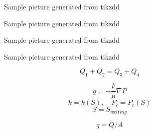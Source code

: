 \documentclass[
	12pt
] {article}
\begin{document}
	\newpage \begin{figure}[H]
		\centering
		\begin{subfigure}[b]{\textwidth}
			\centering
			
		\end{subfigure}
		\caption{Sample picture generated from tikzdd}
	\end{figure}


	\newpage \begin{figure}[H]
		\centering
		\begin{subfigure}[b]{\textwidth}
			\centering
			
		\end{subfigure}
		\caption{Sample picture generated from tikzdd}
	\end{figure}


	\newpage \begin{figure}[H]
		\centering
		\begin{subfigure}[b]{\textwidth}
			\centering
			
		\end{subfigure}
		\caption{Sample picture generated from tikzdd}
	\end{figure}

	\newpage \begin{figure}[H]
		\centering
		\begin{subfigure}[b]{\textwidth}
			\centering
			
		\end{subfigure}
		\caption{Sample picture generated from tikzdd}
	\end{figure}
	\[
		Q_1 + Q_2 = Q_3 + Q_4
	\]

	\[
		q = -\frac{k}{\mu} \nabla P
	\]
	\[
		k = k(S), \quad P_c =  P_c(S)
	\]
	\[
		S = S_{wetting}
	\]

	\[
		q = Q / A
	\]
\end{document}
